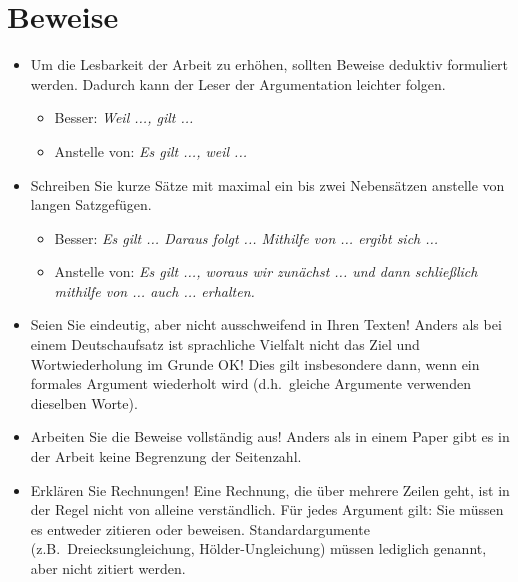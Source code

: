 \documentclass[a4paper,11pt,bibliography=totoc,listof=totoc,headinclude=true,cleardoublepage=empty,oneside]{scrbook}
\begin{document}
\section{Beweise}

{\color{change}
\begin{itemize}

\item Um die Lesbarkeit der Arbeit zu erhöhen, sollten Beweise deduktiv formuliert werden. Dadurch kann der Leser der Argumentation leichter folgen.
\begin{itemize}
\item Besser: \emph{Weil ..., gilt ...} 
\item Anstelle von: \emph{Es gilt ..., weil ...}
\end{itemize}

\item Schreiben Sie kurze Sätze mit maximal ein bis zwei Nebensätzen anstelle von langen Satzgefügen.
\begin{itemize}
\item Besser: \emph{Es gilt ... Daraus folgt ... Mithilfe von ... ergibt sich ...}
\item Anstelle von: \emph{Es gilt ..., woraus wir zunächst ... und dann schließlich mithilfe von ... auch ... erhalten.}
\end{itemize}

\item Seien Sie eindeutig, aber nicht ausschweifend in Ihren Texten! Anders als bei einem Deutschaufsatz ist sprachliche Vielfalt nicht das Ziel und Wortwiederholung im Grunde OK! Dies gilt insbesondere dann, wenn ein formales Argument wiederholt wird (d.h.\ gleiche Argumente verwenden dieselben Worte).

\item Arbeiten Sie die Beweise vollständig aus! Anders als in einem Paper gibt es in der Arbeit keine Begrenzung der Seitenzahl.

\item Erklären Sie Rechnungen! Eine Rechnung, die über mehrere Zeilen geht, ist in der Regel nicht von alleine verständlich. Für jedes Argument gilt: Sie müssen es entweder zitieren oder beweisen. Standardargumente (z.B.\ Dreiecksungleichung, H\"older-Ungleichung) müssen lediglich genannt, aber nicht zitiert werden.


\end{itemize}}
\end{document}
